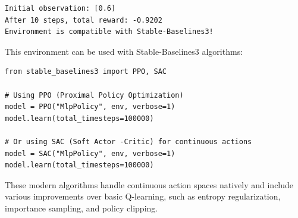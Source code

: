 \begin{verbatim}
Initial observation: [0.6]
After 10 steps, total reward: -0.9202
Environment is compatible with Stable-Baselines3!
\end{verbatim}

This environment can be used with Stable-Baselines3 algorithms:

\begin{verbatim}
from stable_baselines3 import PPO, SAC

# Using PPO (Proximal Policy Optimization)
model = PPO("MlpPolicy", env, verbose=1)
model.learn(total_timesteps=100000)

# Or using SAC (Soft Actor -Critic) for continuous actions
model = SAC("MlpPolicy", env, verbose=1)
model.learn(total_timesteps=100000)
\end{verbatim}

These modern algorithms handle continuous action spaces natively and include various improvements over basic Q-learning, such as entropy regularization, importance sampling, and policy clipping.